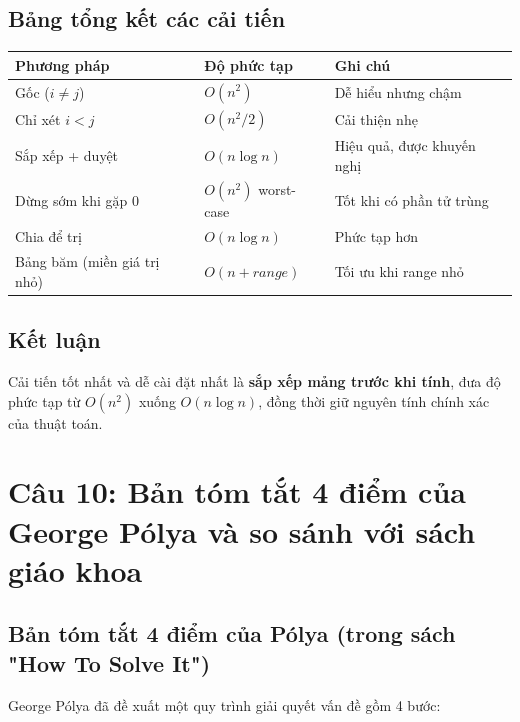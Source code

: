 \documentclass[12pt,a4paper]{article}
\begin{document}
\subsection*{Bảng tổng kết các cải tiến}

\begin{center}
\begin{tabular}{|l|l|l|}
\hline
\textbf{Phương pháp} & \textbf{Độ phức tạp} & \textbf{Ghi chú} \\
\hline
Gốc ($i \neq j$) & $O(n^2)$ & Dễ hiểu nhưng chậm \\
\hline
Chỉ xét $i < j$ & $O(n^2/2)$ & Cải thiện nhẹ \\
\hline
Sắp xếp + duyệt & $O(n \log n)$ & Hiệu quả, được khuyến nghị \\
\hline
Dừng sớm khi gặp 0 & $O(n^2)$ worst-case & Tốt khi có phần tử trùng \\
\hline
Chia để trị & $O(n \log n)$ & Phức tạp hơn \\
\hline
Bảng băm (miền giá trị nhỏ) & $O(n + range)$ & Tối ưu khi range nhỏ \\
\hline
\end{tabular}
\end{center}

\subsection*{Kết luận}
Cải tiến tốt nhất và dễ cài đặt nhất là \textbf{sắp xếp mảng trước khi tính}, đưa độ phức tạp từ $O(n^2)$ xuống $O(n \log n)$, đồng thời giữ nguyên tính chính xác của thuật toán.

\section*{Câu 10: Bản tóm tắt 4 điểm của George Pólya và so sánh với sách giáo khoa}

\subsection*{Bản tóm tắt 4 điểm của Pólya (trong sách "How To Solve It")}

George Pólya đã đề xuất một quy trình giải quyết vấn đề gồm 4 bước:
\end{document}

